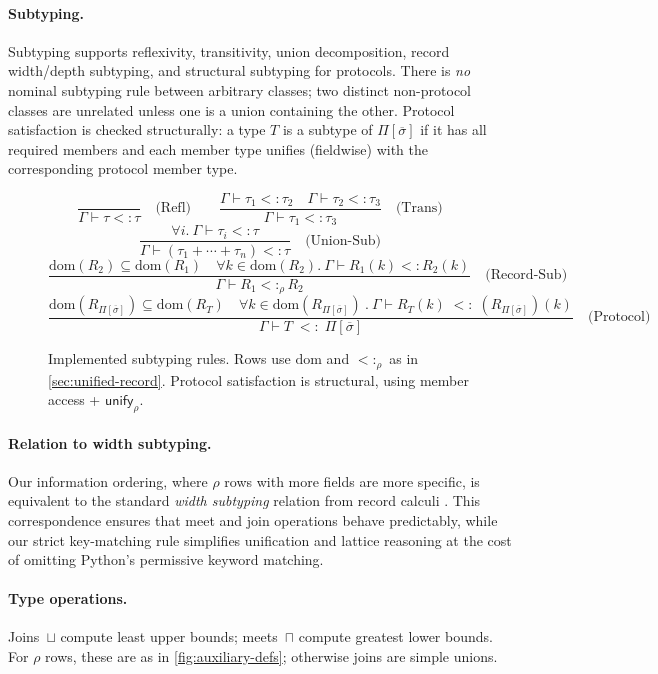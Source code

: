\paragraph{Subtyping.}  
Subtyping supports reflexivity, transitivity, union decomposition, record width/depth subtyping, and structural subtyping for protocols.  
There is \emph{no} nominal subtyping rule between arbitrary classes; two distinct non-protocol classes are unrelated unless one is a union containing the other.  
Protocol satisfaction is checked structurally: a type $T$ is a subtype of $\Pi[\overline{\sigma}]$ if it has all required members and each member type unifies (fieldwise) with the corresponding protocol member type.

\begin{figure*}[t]
\centering
\[
\frac{}{\Gamma \vdash \tau <: \tau} \quad \text{(Refl)}
\qquad
\frac{\Gamma \vdash \tau_1 <: \tau_2 \quad \Gamma \vdash \tau_2 <: \tau_3}{\Gamma \vdash \tau_1 <: \tau_3} \quad \text{(Trans)}
\]
\[
\frac{\forall i.\ \Gamma \vdash \tau_i <: \tau}{\Gamma \vdash (\tau_1 + \cdots + \tau_n) <: \tau} \quad \text{(Union-Sub)}
\]
\[
\frac{\mathrm{dom}(R_2) \subseteq \mathrm{dom}(R_1) \quad \forall k \in \mathrm{dom}(R_2).\ \Gamma \vdash R_1(k) <: R_2(k)}
     {\Gamma \vdash R_1 <:_\rho R_2} \quad \text{(Record-Sub)}
\]
\[
\frac{\mathrm{dom}(R_{\Pi[\overline{\sigma}]}) \subseteq \mathrm{dom}(R_T)
      \quad \forall k \in \mathrm{dom}(R_{\Pi[\overline{\sigma}]})\ .\ \Gamma \vdash R_T(k) \;<:\; (R_{\Pi[\overline{\sigma}]}\!)(k)}
     {\Gamma \vdash T \;<:\; \Pi[\overline{\sigma}]} \quad \text{(Protocol)}
\]
\caption{Implemented subtyping rules. Rows use $\mathrm{dom}$ and $<:_\rho$ as in \autoref{sec:unified-record}. Protocol satisfaction is structural, using member access + $\mathsf{unify}_{\rho}$.}
\label{fig:subtyping}
\end{figure*}

\paragraph{Relation to width subtyping.}
Our information ordering, where $\rho$ rows with more fields are more specific, is
equivalent to the standard \emph{width subtyping} relation from record calculi
\cite{cardelli1992extensible}. This correspondence ensures that meet and join operations
behave predictably, while our strict key-matching rule simplifies unification and
lattice reasoning at the cost of omitting Python’s permissive keyword matching.

\paragraph{Type operations.}  
Joins~$\sqcup$ compute least upper bounds; meets~$\sqcap$ compute greatest lower bounds.  
For $\rho$ rows, these are as in \autoref{fig:auxiliary-defs}; otherwise joins are simple unions.

